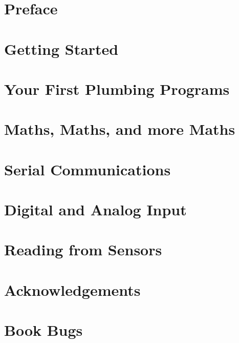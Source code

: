 \documentclass[a5paper,oneside]{scrbook}
\begin{document}
	



\tableofcontents

\chapter*{Preface\label{preface}}


\chapter{Getting Started\label{ch0}}


\chapter{Your First Plumbing Programs\label{ch1}}


\chapter{Maths, Maths, and more Maths}

\chapter{Serial Communications}

\chapter{Digital and Analog Input}


\chapter{Reading from Sensors}


%

\chapter{Acknowledgements\label{acknowledgements}}


\chapter{Book Bugs\label{bugs}}

\end{document}
